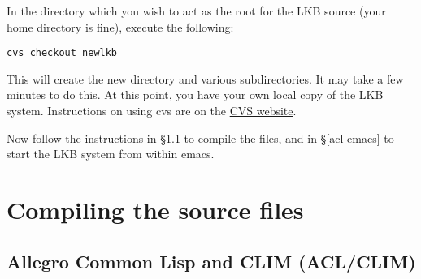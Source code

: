 \documentclass[12pt]{report}
\begin{document}
In the directory which you wish to act as the root for the LKB source
(your home directory is fine), execute the following:
\begin{verbatim}
cvs checkout newlkb
\end{verbatim}
This will create the new directory and various subdirectories.
It may take a few minutes to do this.  At this point, you have 
your own local copy of the LKB system.  Instructions on using
cvs are on the
\href{http://www.loria.fr/~molli/cvs/doc/cvs_toc.html}{CVS website}. 

Now follow the instructions in \S\ref{acl-src} to compile the
files, and in \S\ref{acl-emacs} to start the LKB system from within
emacs.


\section{Compiling the source files}
\label{src}

\subsection{Allegro Common Lisp and CLIM (ACL/CLIM)}
\label{acl-src}
\end{document}
